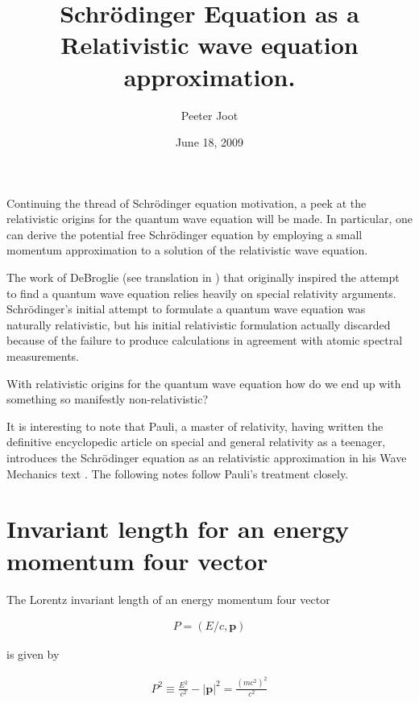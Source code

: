 \documentclass[]{eliblog}
\title{Schr\"{o}dinger Equation as a Relativistic wave equation approximation.}
\author{Peeter Joot}
\date{June 18, 2009}
\newcommand{\Abs}[1]{{\left\lvert{#1}\right\rvert}}
\newcommand{\Bp}[0]{\mathbf{p}}
\begin{document}
\maketitle

Continuing the thread of Schr\"{o}dinger equation motivation, a peek at the  relativistic origins for the quantum wave equation will be made.  In particular, one can derive the potential free Schr\"{o}dinger equation by employing a small momentum approximation to a solution of the relativistic wave equation.

The work of DeBroglie (see translation in \cite{AFkracklauerDeBroglie}) 
that originally inspired the attempt to find a quantum wave equation relies heavily on special relativity arguments.  
Schr\"{o}dinger's initial attempt to formulate a quantum wave equation was naturally relativistic, but his initial relativistic formulation actually discarded because of the failure to produce calculations in agreement with atomic spectral measurements.

With relativistic origins for the quantum wave equation how do we end up with something so manifestly non-relativistic?

It is interesting to note that Pauli, a master of relativity, having
written the definitive encyclopedic article 
\cite{pauli1981tr}
on special and general relativity
as a teenager, introduces the 
Schr\"{o}dinger equation as an relativistic approximation in his Wave Mechanics text \cite{pauli2000wm}.  The following notes follow Pauli's treatment closely.

\section{Invariant length for an energy momentum four vector}

The Lorentz invariant length of an energy momentum four vector 

\begin{align}
P = (E/c, \Bp)
\end{align}

is given by

\begin{align}\label{eqn:Psquared}
P^2 \equiv \frac{E^2}{c^2} - \Abs{\Bp}^2 = \frac{(m c^2)^2}{c^2}
\end{align}
\end{document}
